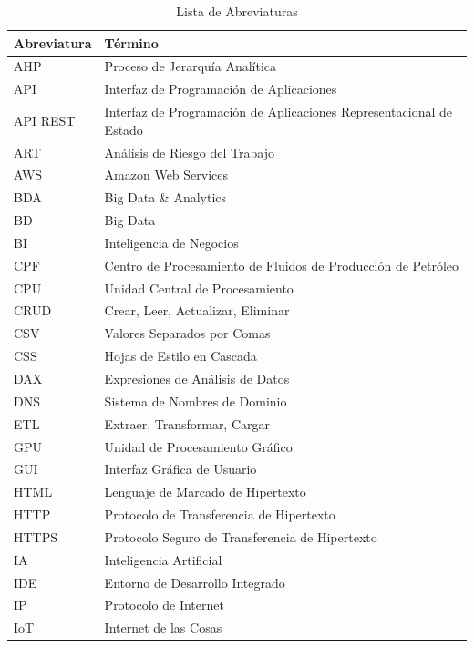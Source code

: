 \documentclass[
  11pt,
  bookmarksnumbered]{article}
\begin{document}
\begin{table}[H]
\centering
\caption{Lista de Abreviaturas} %
\label{tab:abreviaturas}
\fontsize{11}{11}\selectfont %
\begin{tabular}{|l|l|}
\hline
\textbf{Abreviatura} & \textbf{Término} \\ \hline
AHP & Proceso de Jerarquía Analítica \\ \hline
API & Interfaz de Programación de Aplicaciones \\ \hline
API REST & Interfaz de Programación de Aplicaciones Representacional de Estado \\ \hline
ART & Análisis de Riesgo del Trabajo \\ \hline
AWS & Amazon Web Services \\ \hline
BDA & Big Data \& Analytics \\ \hline
BD & Big Data \\ \hline
BI & Inteligencia de Negocios \\ \hline
CPF & Centro de Procesamiento de Fluidos de Producción de Petróleo \\ \hline
CPU & Unidad Central de Procesamiento \\ \hline
CRUD & Crear, Leer, Actualizar, Eliminar \\ \hline
CSV & Valores Separados por Comas \\ \hline
CSS & Hojas de Estilo en Cascada \\ \hline
DAX & Expresiones de Análisis de Datos \\ \hline
DNS & Sistema de Nombres de Dominio \\ \hline
ETL & Extraer, Transformar, Cargar \\ \hline
GPU & Unidad de Procesamiento Gráfico \\ \hline
GUI & Interfaz Gráfica de Usuario \\ \hline
HTML & Lenguaje de Marcado de Hipertexto \\ \hline
HTTP & Protocolo de Transferencia de Hipertexto \\ \hline
HTTPS & Protocolo Seguro de Transferencia de Hipertexto \\ \hline
IA & Inteligencia Artificial \\ \hline
IDE & Entorno de Desarrollo Integrado \\ \hline
IP & Protocolo de Internet \\ \hline
IoT & Internet de las Cosas \\ \hline

\end{tabular}
\end{table}
\end{document}
